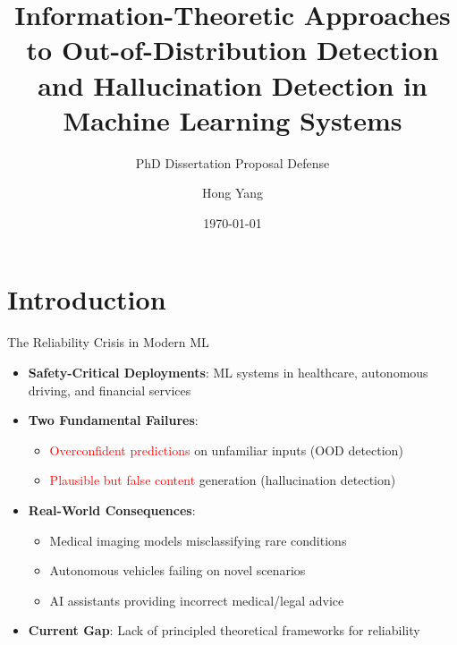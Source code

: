\documentclass[aspectratio=169]{beamer}
\title[Information-Theoretic Approaches to ML Reliability]{Information-Theoretic Approaches to Out-of-Distribution Detection and Hallucination Detection in Machine Learning Systems}
\subtitle{PhD Dissertation Proposal Defense}
\author{Hong Yang}
\institute{Rochester Institute of Technology}
\date{\today}
\begin{document}
\begin{frame}
\titlepage
\end{frame}

\section{Introduction}

\begin{frame}{The Reliability Crisis in Modern ML}
\begin{itemize}
    \item \textbf{Safety-Critical Deployments}: ML systems in healthcare, autonomous driving, and financial services
    \item \textbf{Two Fundamental Failures}:
    \begin{itemize}
        \item \textcolor{red}{Overconfident predictions} on unfamiliar inputs (OOD detection)
        \item \textcolor{red}{Plausible but false content} generation (hallucination detection)
    \end{itemize}
    \item \textbf{Real-World Consequences}:
    \begin{itemize}
        \item Medical imaging models misclassifying rare conditions
        \item Autonomous vehicles failing on novel scenarios
        \item AI assistants providing incorrect medical/legal advice
    \end{itemize}
    \item \textbf{Current Gap}: Lack of principled theoretical frameworks for reliability
\end{itemize}
\end{frame}
\end{document}
